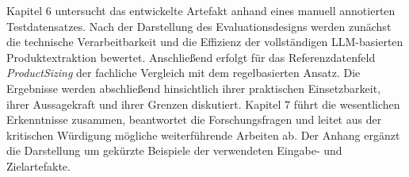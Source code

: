 Kapitel 6 untersucht das entwickelte Artefakt anhand eines manuell annotierten Testdatensatzes. Nach der Darstellung des Evaluationsdesigns werden zunächst die technische Verarbeitbarkeit und die Effizienz der vollständigen LLM-basierten Produktextraktion bewertet. Anschließend erfolgt für das Referenzdatenfeld \textit{ProductSizing} der fachliche Vergleich mit dem regelbasierten Ansatz. Die Ergebnisse werden abschließend hinsichtlich ihrer praktischen Einsetzbarkeit, ihrer Aussagekraft und ihrer Grenzen diskutiert. Kapitel 7 führt die wesentlichen Erkenntnisse zusammen, beantwortet die Forschungsfragen und leitet aus der kritischen Würdigung mögliche weiterführende Arbeiten ab. Der Anhang ergänzt die Darstellung um gekürzte Beispiele der verwendeten Eingabe- und Zielartefakte.